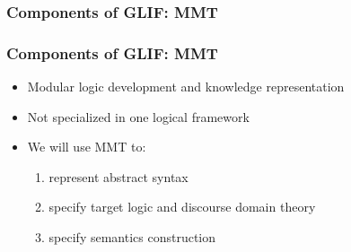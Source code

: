 \begin{frame}
    \frametitle{Components of GLIF: MMT}
    
\end{frame}

\begin{frame}[fragile]
    \frametitle{Components of GLIF: MMT}
    \lstset{frame=single}
    \begin{itemize}   
        \item Modular logic development and knowledge representation
        \item Not specialized in one logical framework 
        \item We will use MMT to:
        \begin{enumerate}
            \item {  represent abstract syntax }
            \item {  specify target logic and discourse domain theory}
            \item {  specify semantics construction}
        \end{enumerate}
    \end{itemize}
    \lstset{basicstyle=\footnotesize\ttfamily}
    
    \vspace{1em}
    \begin{minipage}[t][4cm]{\textwidth}
        \centering
    \end{minipage}
\end{frame}

